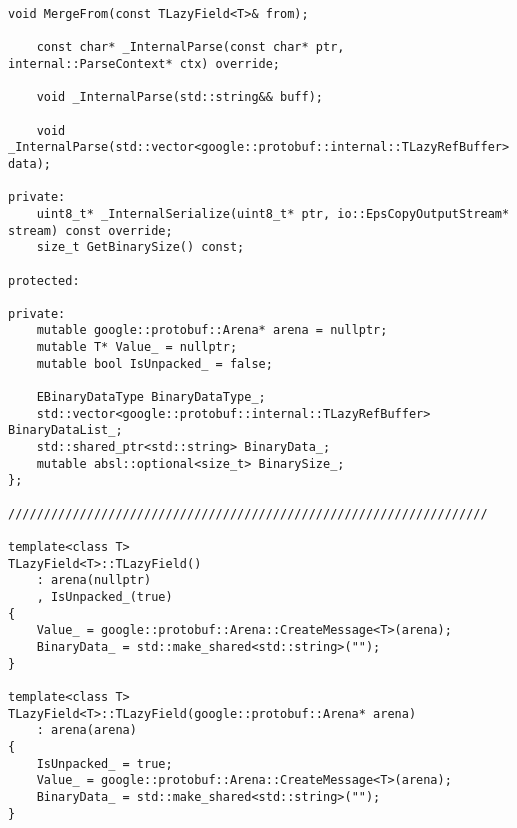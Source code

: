 \begin{lstlisting}[style=CodeListing]
    void MergeFrom(const TLazyField<T>& from);

    const char* _InternalParse(const char* ptr, internal::ParseContext* ctx) override;

    void _InternalParse(std::string&& buff);

    void _InternalParse(std::vector<google::protobuf::internal::TLazyRefBuffer> data);

private:
    uint8_t* _InternalSerialize(uint8_t* ptr, io::EpsCopyOutputStream* stream) const override;
    size_t GetBinarySize() const;

protected:

private:
    mutable google::protobuf::Arena* arena = nullptr;
    mutable T* Value_ = nullptr;
    mutable bool IsUnpacked_ = false;

    EBinaryDataType BinaryDataType_;
    std::vector<google::protobuf::internal::TLazyRefBuffer> BinaryDataList_;
    std::shared_ptr<std::string> BinaryData_;
    mutable absl::optional<size_t> BinarySize_;
};

///////////////////////////////////////////////////////////////////

template<class T>
TLazyField<T>::TLazyField() 
    : arena(nullptr)
    , IsUnpacked_(true)
{
    Value_ = google::protobuf::Arena::CreateMessage<T>(arena);
    BinaryData_ = std::make_shared<std::string>("");
}

template<class T>
TLazyField<T>::TLazyField(google::protobuf::Arena* arena)
    : arena(arena) 
{
    IsUnpacked_ = true;
    Value_ = google::protobuf::Arena::CreateMessage<T>(arena);
    BinaryData_ = std::make_shared<std::string>("");
}

\end{lstlisting}
\pagebreak
